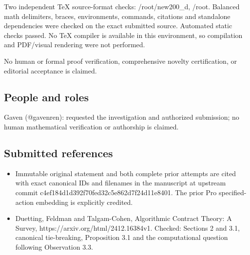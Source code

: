 \documentclass[11pt]{article}
\begin{document}
Two independent TeX source-format checks: /root/new200\_d, /root. Balanced math delimiters, braces, environments, commands, citations and standalone dependencies were checked on the exact submitted source. Automated static checks passed. No TeX compiler is available in this environment, so compilation and PDF/visual rendering were not performed.

No human or formal proof verification, comprehensive novelty certification, or editorial acceptance is claimed.

\subsection{People and roles}

Gaven (@gavenren): requested the investigation and authorized submission; no human mathematical verification or authorship is claimed.

\subsection{Submitted references}

\begin{itemize}
\item
  Immutable original statement and both complete prior attempts are cited with exact canonical IDs and filenames in the manuscript at upstream commit c4ef184d1d392f70fed32c5e862d7f24d11e8401. The prior Pro specified-action embedding is explicitly credited.
\item
  Duetting, Feldman and Talgam-Cohen, Algorithmic Contract Theory: A Survey, https://arxiv.org/html/2412.16384v1. Checked: Sections 2 and 3.1, canonical tie-breaking, Proposition 3.1 and the computational question following Observation 3.3.
\end{itemize}
\end{document}
